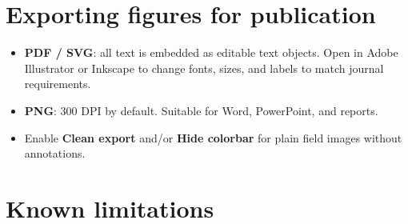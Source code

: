 \documentclass[11pt, a4paper]{report}
\newcommand{\uipth}[1]{\textbf{\textcolor{upblue}{#1}}}
\begin{document}
\section{Exporting figures for publication}

\begin{itemize}[leftmargin=1.5em]
  \item \textbf{PDF / SVG}: all text is embedded as editable text objects. Open in Adobe Illustrator or Inkscape to change fonts, sizes, and labels to match journal requirements.
  \item \textbf{PNG}: 300 DPI by default. Suitable for Word, PowerPoint, and reports.
  \item Enable \uipth{Clean export} and/or \uipth{Hide colorbar} for plain field images without annotations.
\end{itemize}

\section{Known limitations}
\end{document}

